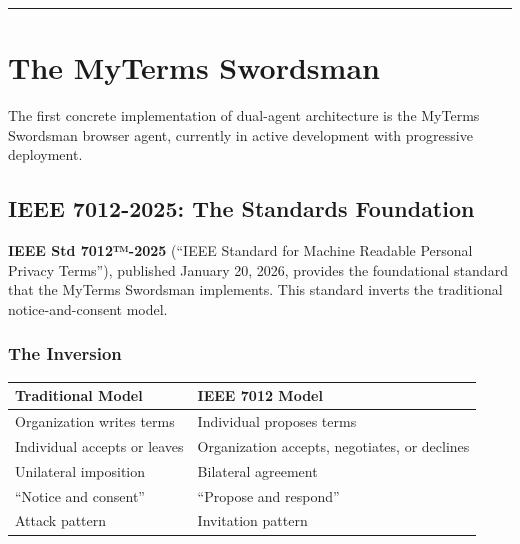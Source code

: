 \documentclass[
]{article}
\newcounter{none} %
\begin{document}
\begin{center}\rule{0.5\linewidth}{0.5pt}\end{center}

\section{The MyTerms Swordsman}\label{the-myterms-swordsman}

The first concrete implementation of dual-agent architecture is the
MyTerms Swordsman browser agent, currently in active development with
progressive deployment.

\subsection{IEEE 7012-2025: The Standards
Foundation}\label{ieee-7012-2025-the-standards-foundation}

\textbf{IEEE Std 7012™-2025} (``IEEE Standard for Machine Readable
Personal Privacy Terms''), published January 20, 2026, provides the
foundational standard that the MyTerms Swordsman implements. This
standard inverts the traditional notice-and-consent model.

\subsubsection{The Inversion}\label{the-inversion}

{\def\LTcaptype{none} %
\begin{longtable}[]{@{}
  >{\raggedright\arraybackslash}p{}
  >{\raggedright\arraybackslash}p{}@{}}
\toprule\noalign{}
\begin{minipage}[b]{\linewidth}\raggedright
Traditional Model
\end{minipage} & \begin{minipage}[b]{\linewidth}\raggedright
IEEE 7012 Model
\end{minipage} \\
\midrule\noalign{}
\endhead
\bottomrule\noalign{}
\endlastfoot
Organization writes terms & Individual proposes terms \\
Individual accepts or leaves & Organization accepts, negotiates, or
declines \\
Unilateral imposition & Bilateral agreement \\
``Notice and consent'' & ``Propose and respond'' \\
Attack pattern & Invitation pattern \\
\end{longtable}
}
\end{document}

